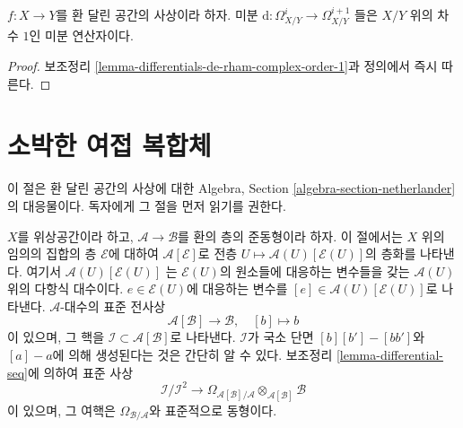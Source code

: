 \begin{lemma}
\label{lemma-differentials-relative-de-rham-complex-order-1}
$f : X \to Y$를 환 달린 공간의 사상이라 하자. 미분
$\text{d} : \Omega^i_{X/Y}  \to \Omega^{i + 1}_{X/Y}$
들은 $X/Y$ 위의 차수 $1$인 미분 연산자이다.
\end{lemma}

\begin{proof}
보조정리 \ref{lemma-differentials-de-rham-complex-order-1}과 정의에서
즉시 따른다.
\end{proof}





















\section{소박한 여접 복합체}
\label{section-netherlander}

\noindent
이 절은 환 달린 공간의 사상에 대한 Algebra, Section
\ref{algebra-section-netherlander}의 대응물이다.
독자에게 그 절을 먼저 읽기를 권한다.

\medskip\noindent
$X$를 위상공간이라 하고, $\mathcal{A} \to \mathcal{B}$를 환의 층의
준동형이라 하자. 이 절에서는 $X$ 위의 임의의 집합의 층
$\mathcal{E}$에 대하여 $\mathcal{A}[\mathcal{E}]$로 전층
$U \mapsto \mathcal{A}(U)[\mathcal{E}(U)]$의 층화를 나타낸다. 여기서
$\mathcal{A}(U)[\mathcal{E}(U)]$
는 $\mathcal{E}(U)$의 원소들에 대응하는 변수들을 갖는
$\mathcal{A}(U)$ 위의 다항식 대수이다.
$e \in \mathcal{E}(U)$에 대응하는 변수를
$[e] \in \mathcal{A}(U)[\mathcal{E}(U)]$로 나타낸다.
$\mathcal{A}$-대수의 표준 전사상
\begin{equation}
\label{equation-canonical-presentation}
\mathcal{A}[\mathcal{B}] \longrightarrow \mathcal{B},\quad [b] \longmapsto b
\end{equation}
이 있으며, 그 핵을 $\mathcal{I} \subset \mathcal{A}[\mathcal{B}]$로
나타낸다. $\mathcal{I}$가 국소 단면 $[b][b'] - [bb']$와 $[a] - a$에
의해 생성된다는 것은 간단히 알 수 있다. 보조정리
\ref{lemma-differential-seq}에 의하여 표준 사상
\begin{equation}
\label{equation-naive-cotangent-complex}
\mathcal{I}/\mathcal{I}^2
\longrightarrow
\Omega_{\mathcal{A}[\mathcal{B}]/\mathcal{A}}
\otimes_{\mathcal{A}[\mathcal{B}]} \mathcal{B}
\end{equation}
이 있으며, 그 여핵은 $\Omega_{\mathcal{B}/\mathcal{A}}$와 표준적으로
동형이다.

